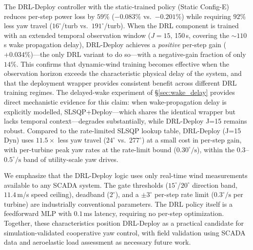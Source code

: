 \documentclass[final,5p,times]{elsarticle}
\begin{document}
The DRL-Deploy controller with the static-trained policy (Static Config-E) reduces per-step power loss by $59\%$ ($-0.083\%$ vs.\ $-0.201\%$) while requiring $92\%$ less yaw travel ($16^\circ$/turb vs.\ $191^\circ$/turb). When the DRL component is trained with an extended temporal observation window ($J{=}15$, 150\,s, covering the ${\sim}110$\,s wake propagation delay), DRL-Deploy achieves a \emph{positive} per-step gain ($+0.034\%$)---the only DRL variant to do so---with a negative-gain fraction of only $14\%$. This confirms that dynamic-wind training becomes effective when the observation horizon exceeds the characteristic physical delay of the system, and that the deployment wrapper provides consistent benefit across different DRL training regimes. The delayed-wake experiment of \S\ref{sec:wake_delay} provides direct mechanistic evidence for this claim: when wake-propagation delay is explicitly modelled, SLSQP+Deploy---which shares the identical wrapper but lacks temporal context---degrades substantially, while DRL-Deploy J=15 remains robust. Compared to the rate-limited SLSQP lookup table, DRL-Deploy (J=15 Dyn) uses $11.5{\times}$ less yaw travel ($24^\circ$ vs.\ $277^\circ$) at a small cost in per-step gain, with per-turbine peak yaw rates at the rate-limit bound ($0.30^\circ\!/\!\mathrm{s}$), within the $0.3$--$0.5^\circ\!/\!\mathrm{s}$ band of utility-scale yaw drives.

We emphasize that the DRL-Deploy logic uses only real-time wind measurements available to any SCADA system. The gate thresholds ($15^\circ$/$20^\circ$ direction band, $11.4$\,m/s speed ceiling), deadband ($2^\circ$), and a $\pm3^\circ$ per-step rate limit ($0.3^\circ\!/\!\mathrm{s}$ per turbine) are industrially conventional parameters. The DRL policy itself is a feedforward MLP with $0.1$\,ms latency, requiring no per-step optimization. Together, these characteristics position DRL-Deploy as a practical candidate for simulation-validated cooperative yaw control, with field validation using SCADA data and aeroelastic load assessment as necessary future work.
\end{document}
